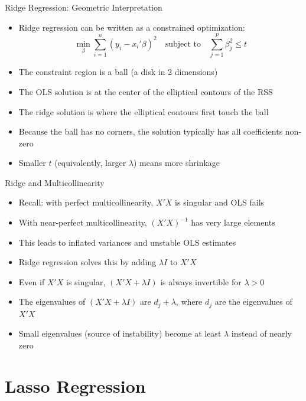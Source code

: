\documentclass[aspectratio=169]{beamer}
\begin{document}
\begin{frame}{Ridge Regression: Geometric Interpretation}
\begin{itemize}
    \item Ridge regression can be written as a constrained optimization:
    \[\min_{\beta} \sum_{i=1}^{n}(y_i - x_i'\beta)^2 \quad \text{subject to} \quad \sum_{j=1}^{p}\beta_j^2 \leq t\]
    \item The constraint region is a ball (a disk in 2 dimensions)
    \item The OLS solution is at the center of the elliptical contours of the RSS
    \item The ridge solution is where the elliptical contours first touch the ball
    \item Because the ball has no corners, the solution typically has all coefficients non-zero
    \item Smaller $t$ (equivalently, larger $\lambda$) means more shrinkage
\end{itemize}
\end{frame}

\begin{frame}{Ridge and Multicollinearity}
\begin{itemize}
    \item Recall: with perfect multicollinearity, $X'X$ is singular and OLS fails
    \item With near-perfect multicollinearity, $(X'X)^{-1}$ has very large elements
    \item This leads to inflated variances and unstable OLS estimates
    \item Ridge regression solves this by adding $\lambda I$ to $X'X$
    \item Even if $X'X$ is singular, $(X'X + \lambda I)$ is always invertible for $\lambda > 0$
    \item The eigenvalues of $(X'X + \lambda I)$ are $d_j + \lambda$, where $d_j$ are the eigenvalues of $X'X$
    \item Small eigenvalues (source of instability) become at least $\lambda$ instead of nearly zero
\end{itemize}
\end{frame}

\section{Lasso Regression}
\end{document}
